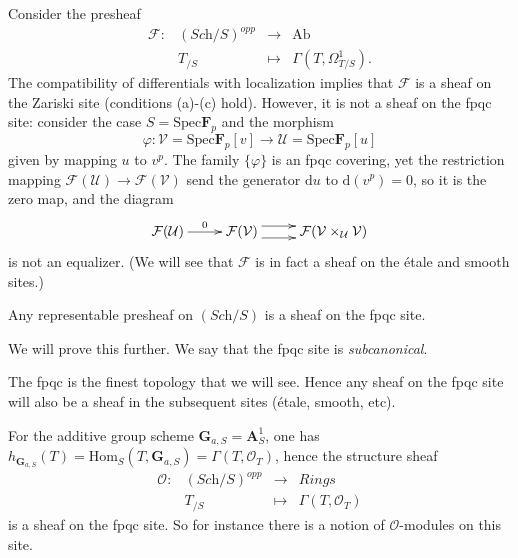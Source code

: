 \begin{example}
\label{example-quasi-coherent}
Consider the presheaf 
$$
\begin{matrix}
\mathcal{F} : & (\textit{Sch}/S)^{opp} & \to & \text{Ab} \\
& T_{/S} & \mapsto & \Gamma(T, \Omega^1_{T/S}).
\end{matrix}
$$
The compatibility of differentials with localization implies that
$\mathcal{F}$ is a sheaf on the Zariski site (conditions (a)-(c) hold).
However, it is not a sheaf on the fpqc site: consider the case
$S = \text{Spec} \mathbf{F}_p$ and the morphism
$$
\varphi: \mathcal{V} =
\text{Spec} \mathbf{F}_p[v] \to \mathcal{U} = 
\text{Spec} \mathbf{F}_p[u]
$$
given by mapping $u$ to $v^p$. The family $\{\varphi \}$ is an fpqc covering, 
yet the restriction mapping $\mathcal{F}(\mathcal{U}) \to 
\mathcal{F}(\mathcal{V})$ send the generator $\mathrm{d} u$ to $\mathrm{d}(v^p) 
= 0$, so it is the zero map, and the diagram
$$
\xymatrix{
\mathcal{F}(\mathcal{U}) \ar[r]^{0} &
\mathcal{F}(\mathcal{V}) \ar@<1ex>[r] \ar@<-1ex>[r] &
\mathcal{F}(\mathcal{V} \times_\mathcal{U} \mathcal{V})
}
$$
is not an equalizer. (We will see that $\mathcal{F}$ is in fact a sheaf on the 
\'etale and smooth sites.)
\end{example}

\begin{lemma}
\label{lemma-representable-sheaf-fpqc}
Any representable presheaf on $(\textit{Sch}/S)$ is a sheaf on the fpqc site.
\end{lemma}

\noindent
We will prove this further. We say that the fpqc site is {\it subcanonical}.

\begin{remark}
\label{remark-fpqc-finest}
The fpqc is the finest topology that we will see. Hence any sheaf on the 
fpqc site will also be a sheaf in the subsequent sites (\'etale, smooth, etc).
\end{remark}

\begin{example}
\label{example-additive-group-sheaf}
For the additive group scheme $\mathbf{G}_{a,S} = \mathbf{A}^1_S$, one has 
$h_{\mathbf{G}_{a,S}} (T) = \text{Hom}_S (T,\mathbf{G}_{a,S}) = 
\Gamma(T,\mathcal{O}_T)$, hence the structure sheaf
$$
\begin{matrix}
\mathcal{O} : &
(\textit{Sch}/S)^{opp} &
\to &
\textit{Rings} \\
&
T_{/S} &
\mapsto &
\Gamma(T, \mathcal{O}_{T})
\end{matrix}
$$
is a sheaf on the fpqc site. So for instance there is a notion of 
$\mathcal{O}$-modules on this site.
\end{example}




